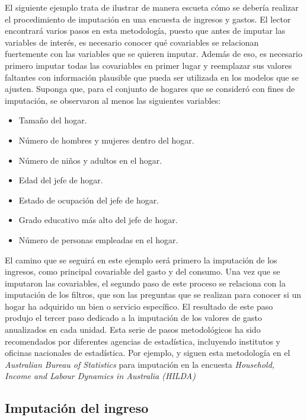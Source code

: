 \documentclass[
  12pt,
  spanish,
]{book}
\providecommand{\tightlist}{%
  \setlength{\itemsep}{0pt}\setlength{\parskip}{0pt}}
\begin{document}
El siguiente ejemplo trata de ilustrar de manera escueta cómo se debería realizar el procedimiento de imputación en una encuesta de ingresos y gastos. El lector encontrará varios pasos en esta metodología, puesto que antes de imputar las variables de interés, es necesario conocer qué covariables se relacionan fuertemente con las variables que se quieren imputar. Además de eso, es necesario primero imputar todas las covariables en primer lugar y reemplazar sus valores faltantes con información plausible que pueda ser utilizada en los modelos que se ajusten. Suponga que, para el conjunto de hogares que se consideró con fines de imputación, se observaron al menos las siguientes variables:

\begin{itemize}
\tightlist
\item
  Tamaño del hogar.
\item
  Número de hombres y mujeres dentro del hogar.
\item
  Número de niños y adultos en el hogar.
\item
  Edad del jefe de hogar.
\item
  Estado de ocupación del jefe de hogar.
\item
  Grado educativo más alto del jefe de hogar.
\item
  Número de personas empleadas en el hogar.
\end{itemize}

El camino que se seguirá en este ejemplo será primero la imputación de los ingresos, como principal covariable del gasto y del consumo. Una vez que se imputaron las covariables, el segundo paso de este proceso se relaciona con la imputación de los filtros, que son las preguntas que se realizan para conocer si un hogar ha adquirido un bien o servicio específico. El resultado de este paso produjo el tercer paso dedicado a la imputación de los valores de gasto anualizados en cada unidad. Esta serie de pasos metodológicos ha sido recomendados por diferentes agencias de estadística, incluyendo institutos y oficinas nacionales de estadística. Por ejemplo, \citet{Hayes_Watson_2009} y \citet{Sun_2010} siguen esta metodología en el \emph{Australian Bureau of Statistics} para imputación en la encuesta \emph{Household, Income and Labour Dynamics in Australia (HILDA)}

\hypertarget{imputaciuxf3n-del-ingreso}{%
\subsection{Imputación del ingreso}\label{imputaciuxf3n-del-ingreso}}
\end{document}
